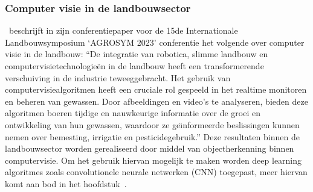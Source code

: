 \subsubsection{Computer visie in de landbouwsector}
\textcite{Radojcic2023}~beschrijft in zijn conferentiepaper voor de 15de Internationale Landbouwsymposium `AGROSYM 2023' conferentie het volgende over computer visie in de landbouw:
``De integratie van robotica, slimme landbouw en computervisietechnologie\"en in de landbouw heeft een transformerende verschuiving in de industrie teweeggebracht.
Het gebruik van computervisiealgoritmen heeft een cruciale rol gespeeld in het realtime monitoren en beheren van gewassen.
Door afbeeldingen en video's te analyseren, bieden deze algoritmen boeren tijdige en nauwkeurige informatie over de groei en ontwikkeling van hun gewassen, waardoor ze ge\"{\i}nformeerde beslissingen kunnen nemen over bemesting, irrigatie en pesticidegebruik.''
Deze resultaten binnen de landbouwsector worden gerealiseerd door middel van objectherkenning binnen computervisie.
Om het gebruik hiervan mogelijk te maken worden deep learning algoritmes zoals convolutionele neurale netwerken (CNN) toegepast, meer hiervan komt aan bod in het hoofdstuk~.

